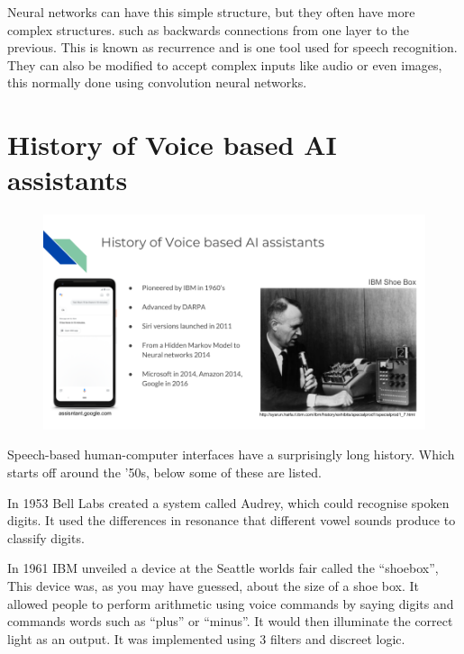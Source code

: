 \documentclass[10pt]{article}
\begin{document}
        Neural networks can have this simple structure, but they often have more complex structures. such as backwards connections from one layer to the previous. This is known as recurrence and is one tool used for speech recognition.  They can also be modified to accept complex inputs like audio or even images, this normally done using convolution neural networks.


        \newpage

    \section*{History of Voice based AI assistants}
	    
	    \begin{figure}[H]
            \centering
            \includegraphics[width=1\textwidth]{slide_2}
            \label{fig:appendix:slide_2}
        \end{figure}
        

        Speech-based human-computer interfaces have a surprisingly long history.  Which starts off around the '50s, below some of these are listed. 
        
        In 1953 Bell Labs created a system called Audrey, which could recognise spoken digits.\cite{juang2005automatic}
        It used the differences in resonance that different vowel sounds produce to classify digits.\cite{davis1952automatic}

                In 1961 IBM unveiled a device at the Seattle worlds fair called the “shoebox”\cite{shoebox}, This device was, as you may have guessed, about the size of a shoe box. 
        It allowed people to perform arithmetic using voice commands by saying digits and commands words such as “plus” or “minus”. It would then illuminate the correct light as an output. It was implemented using 3 filters and discreet logic.
        
\end{document}

